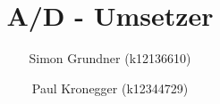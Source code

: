 \documentclass[a4paper,oneside,11pt,ngerman]{scrartcl}
\begin{document}
\title{A/D - Umsetzer}
\author{Simon Grundner (k12136610) \and Paul Kronegger (k12344729)}

% 

\tableofcontents







\end{document}
